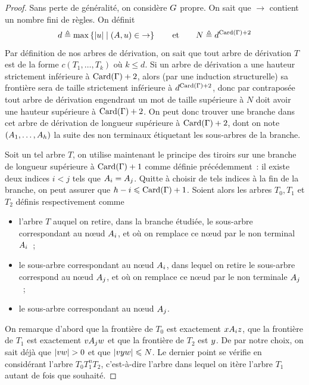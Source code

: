 \begin{proof}
  Sans perte de généralité, on considère $G$ propre.
  On sait que $\to$ contient un nombre fini de règles. On définit
  \[d \triangleq \max \left\{ |u| \;\middle\vert\; (A,u) \in \mathord{\to} \right\}\qquad
  \text{et}
  \qquad N \triangleq d^{\operatorname{Card}(\Gamma)+2}\]
  Par définition de nos arbres de dérivation, on sait que tout arbre de
  dérivation $T$ est de la forme $c(T_1,\ldots,T_k)$ où $k \leq d$. Si un arbre
  de dérivation a une hauteur strictement inférieure à $\operatorname{Card}(\Gamma)+2$, alors
  (par une induction structurelle) sa frontière sera de taille strictement
  inférieure à $d^{\operatorname{Card}(\Gamma)+2}$, donc par contraposée tout arbre de dérivation
  engendrant un mot de taille supérieure à $N$ doit avoir une hauteur supérieure
  à $\operatorname{Card}(\Gamma)+2$. On peut donc trouver une branche dans cet arbre de
  dérivation de longueur supérieure à $\operatorname{Card}(\Gamma)+2$, dont on note
  $(A_1,\ldots,A_{h})$ la suite des non terminaux étiquetant les
  sous-arbres de la branche.

  Soit un tel arbre $T$, on utilise maintenant le principe des tiroirs sur une
  branche de longueur supérieure à $\operatorname{Card}(\Gamma) + 1$ comme définie
  précédemment~: il existe deux indices $i < j$ tels que $A_i = A_j$.
  Quitte à choisir de tels indices à la fin de la branche, on peut assurer que
  $h - i \leqslant \operatorname{Card}(\Gamma) + 1$. Soient alors les arbres $T_0,T_1$ et $T_2$
  définis respectivement comme
  \begin{itemize}
  \item l'arbre $T$ auquel on retire, dans la branche étudiée, le sous-arbre
    correspondant au n\oe ud $A_i$, et où on remplace ce n\oe ud par le
    non terminal $A_i$~;
  \item le sous-arbre correspondant au n\oe ud $A_i$, dans lequel on
    retire le sous-arbre correspond au n\oe ud $A_j$, et où on remplace ce
    n\oe ud par le non terminale $A_j$~;
  \item le sous-arbre correspondant au n\oe ud $A_j$.
  \end{itemize}

  On remarque d'abord que la frontière de $T_0$ est exactement
  $xA_iz$, que la frontière de $T_1$ est exactement
  $vA_jw$ et que la frontière de $T_2$ est $y$. De par notre
  choix, on sait déjà que $|vw| > 0$ et que
  $|vyw| \leqslant N$. Le dernier point se vérifie en considérant
  l'arbre $T_0 T_1^n T_2$, c'est-à-dire l'arbre dans lequel on itère l'arbre
  $T_1$ autant de fois que souhaité.
\end{proof}

